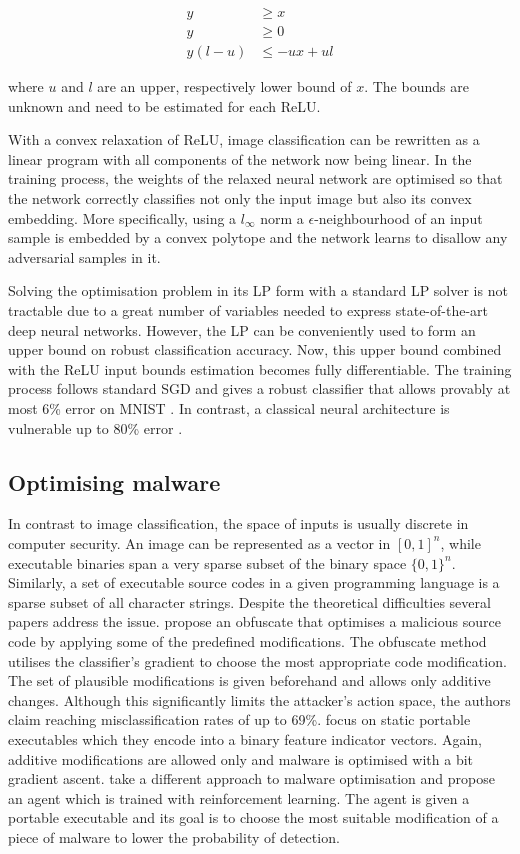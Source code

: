 \begin{align}
    y &\geq x \\
    y &\geq 0 \\
    y(l-u) &\leq -ux + ul
\end{align}

where $u$ and $l$ are an upper, respectively lower bound of $x$.
The bounds are unknown and need to be estimated for each ReLU.

With a convex relaxation of ReLU, image classification can be rewritten
as a linear program with all components of the network now being linear.
In the training process, the weights of the relaxed neural network are
optimised so that the network correctly classifies not only the input
image but also its convex embedding. More specifically, using a
$l_\infty$ norm a $\epsilon$-neighbourhood of an input sample is
embedded by a convex polytope and the network learns to disallow any
adversarial samples in it.

Solving the optimisation problem in its LP form with a standard LP
solver is not tractable due to a great number of variables needed to
express state-of-the-art deep neural networks. However, the LP can be
conveniently used to form an upper bound on robust classification
accuracy. Now, this upper bound combined with the ReLU input bounds
estimation becomes fully differentiable. The training process follows
standard SGD \cite{sgd} and gives a robust classifier that allows provably at most
6\% error on MNIST \cite{mnist}. In contrast, a classical neural architecture is
vulnerable up to 80\% error \cite{provable_defenses}.

\subsection{Optimising malware}

In contrast to image classification, the space of inputs is usually
discrete in computer security. An image can be represented as a vector
in $[0, 1]^n$, while executable binaries span a very sparse subset of
the binary space $\{0, 1\}^n$. Similarly, a set of executable source
codes in a given programming language is a sparse subset of all
character strings. Despite the theoretical difficulties several papers
address the issue. \cite{adversarial_malware} propose an obfuscate that optimises
a malicious source code by applying some of the predefined
modifications. The obfuscate method utilises the classifier’s gradient
to choose the most appropriate code modification. The set of plausible
modifications is given beforehand and allows only additive changes.
Although this significantly limits the attacker’s action space, the
authors claim reaching misclassification rates of up to 69\%.
\cite{adversarial_malware_binary} focus on static portable executables which they encode
into a binary feature indicator vectors. Again, additive modifications
are allowed only and malware is optimised with a bit gradient ascent.
\cite{adversarial_malware_pe} take a different approach to malware optimisation and
propose an agent which is trained with reinforcement learning. The agent
is given a portable executable and its goal is to choose the most
suitable modification of a piece of malware to lower the probability of
detection.

